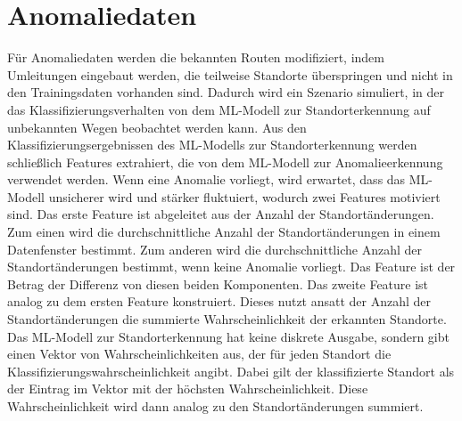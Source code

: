 \section{Anomaliedaten}
\label{sec:data_anomalie}
Für Anomaliedaten werden die bekannten Routen modifiziert, indem Umleitungen eingebaut werden, die teilweise Standorte überspringen
und nicht in den Trainingsdaten vorhanden sind.
Dadurch wird ein Szenario simuliert, in der das Klassifizierungsverhalten von dem ML-Modell zur Standorterkennung auf unbekannten Wegen beobachtet werden kann.
Aus den Klassifizierungsergebnissen des ML-Modells zur Standorterkennung werden schließlich Features extrahiert,
die von dem ML-Modell zur Anomalieerkennung verwendet werden.
\newline
\newline
Wenn eine Anomalie vorliegt, wird erwartet, dass das ML-Modell unsicherer wird und stärker fluktuiert,
wodurch zwei Features motiviert sind.
Das erste Feature ist abgeleitet aus der Anzahl der Standortänderungen.
Zum einen wird die durchschnittliche Anzahl der Standortänderungen in einem Datenfenster bestimmt.
Zum anderen wird die durchschnittliche Anzahl der Standortänderungen bestimmt, wenn keine Anomalie vorliegt.
Das Feature ist der Betrag der Differenz von diesen beiden Komponenten.
\newline
\newline
Das zweite Feature ist analog zu dem ersten Feature konstruiert.
Dieses nutzt ansatt der Anzahl der Standortänderungen die summierte Wahrscheinlichkeit der erkannten Standorte.
Das ML-Modell zur Standorterkennung hat keine diskrete Ausgabe, sondern gibt einen Vektor von Wahrscheinlichkeiten aus,
der für jeden Standort die Klassifizierungswahrscheinlichkeit angibt.
Dabei gilt der klassifizierte Standort als der Eintrag im Vektor mit der höchsten Wahrscheinlichkeit.
Diese Wahrscheinlichkeit wird dann analog zu den Standortänderungen summiert.
